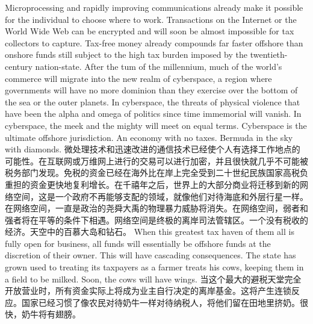 \begin{paracol}{2}[]
\switchcolumn*
Microprocessing and rapidly improving communications already make it possible for the individual to choose where to work. Transactions on the Internet or the World Wide Web can be encrypted and will soon be almost impossible for tax collectors to capture. Tax-free money already compounds far faster offshore than onshore funds still subject to the high tax burden imposed by the twentieth-century nation-state. After the tum of the millennium, much of the world's commerce will migrate into the new realm of cyberspace, a region where governments will have no more dominion than they exercise over the bottom of the sea or the outer planets. In cyberspace, the threats of physical violence that have been the alpha and omega of politics since time immemorial will vanish. In cyberspace, the meek and the mighty will meet on equal terms. Cyberspace is the ultimate offshore jurisdiction. An economy with no taxes. Bermuda in the sky with diamonds.
\switchcolumn
微处理技术和迅速改进的通信技术已经使个人有选择工作地点的可能性。在互联网或万维网上进行的交易可以进行加密，并且很快就几乎不可能被税务部门发现。免税的资金已经在海外比在岸上完全受到二十世纪民族国家高税负重担的资金更快地复利增长。在千禧年之后，世界上的大部分商业将迁移到新的网络空间，这是一个政府不再能够支配的领域，就像他们对待海底和外层行星一样。在网络空间，一直是政治的尧舜大禹的物理暴力威胁将消失。在网络空间，弱者和强者将在平等的条件下相遇。网络空间是终极的离岸司法管辖区。一个没有税收的经济。天空中的百慕大岛和钻石。
\switchcolumn*
When this greatest tax haven of them all is fully open for business, all funds will essentially be offshore funds at the discretion of their owner. This will have cascading consequences. The state has grown used to treating its taxpayers as a farmer treats his cows, keeping them in a field to be milked. Soon, the cows will have wings.
\switchcolumn
当这个最大的避税天堂完全开放营业时，所有资金实际上将成为业主自行决定的离岸基金。这将产生连锁反应。国家已经习惯了像农民对待奶牛一样对待纳税人，将他们留在田地里挤奶。很快，奶牛将有翅膀。
\end{paracol}

